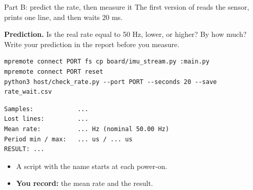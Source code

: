 \begin{frame}[fragile]{Part B: predict the rate, then measure it}
  \small
  The first version of  reads the sensor, prints
  one line, and then waits 20 ms.
  \begin{exerciseblock}
    \textbf{Prediction.} Is the real rate equal to 50 Hz, lower, or higher?
    By how much? Write your prediction in the report before you measure.
  \end{exerciseblock}
\begin{lstlisting}[style=shell]
mpremote connect PORT fs cp board/imu_stream.py :main.py
mpremote connect PORT reset
python3 host/check_rate.py --port PORT --seconds 20 --save rate_wait.csv
\end{lstlisting}
\begin{lstlisting}
Samples:            ...
Lost lines:         ...
Mean rate:          ... Hz (nominal 50.00 Hz)
Period min / max:   ... us / ... us
RESULT: ...
\end{lstlisting}
  \begin{itemize}
    \item A script with the name  starts at each power-on.
    \item \textbf{You record:} the mean rate and the result.
  \end{itemize}
\end{frame}


